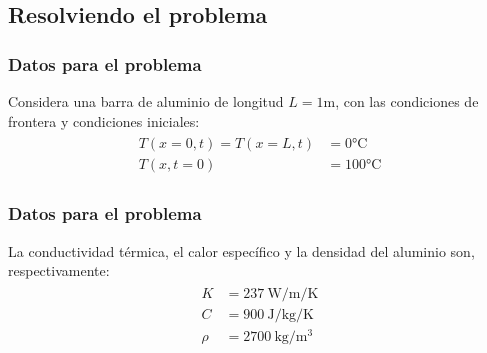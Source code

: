 \subsection{Resolviendo el problema}
\begin{frame}
\frametitle{Datos para el problema}
Considera una barra de aluminio de longitud $L = 1 \si\meter$, con las condiciones de frontera y condiciones iniciales:
\begin{align}
\begin{aligned}
T(x = 0, t) = T(x = L, t) &= 0 \si\celsius \\
T(x, t = 0) &= 100 \si\celsius
\end{aligned}
\label{eq:ecuacion_17_77}
\end{align}
\end{frame}
\begin{frame}[fragile]
\frametitle{Datos para el problema}
La conductividad térmica, el calor específico y la densidad del aluminio son, respectivamente:
\begin{align}
\begin{aligned}
K &= 237 \: \si{\watt\per\meter\per\kelvin} \\
C &= 900 \: \si{\joule\per\kilogram\per\kelvin} \\
\rho &= 2700 \: \si{\kilogram\per\cubic\metre}
\end{aligned}
\label{eq:ecuacion_17_78}
\end{align}
\end{frame}
